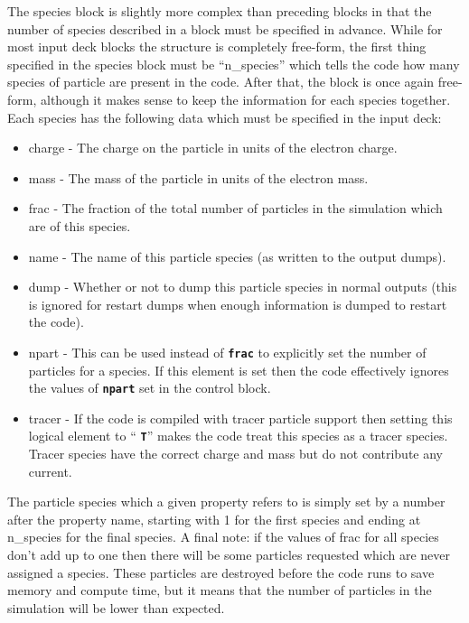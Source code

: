 \documentclass[12pt,a4paper]{article}
\newcommand{\inlinecode}[1]{{\color{warwickred} \bf\texttt{#1}}}
\begin{document}
The species block is slightly more complex than preceding blocks in that the
number of species described in a block must be specified in advance. While
for most input deck blocks the structure is completely free-form, the first
thing specified in the species block must be ``n\_species'' which tells the
code how many species of particle are present in the code. After that, the
block is once again free-form, although it makes sense to keep the information
for each species together. Each species has the following data which must be
specified in the input deck:\\
\begin{itemize}
\item charge - The charge on the particle in units of the electron charge.
\item mass - The mass of the particle in units of the electron mass.
\item frac - The fraction of the total number of particles in the simulation
  which are of this species.
\item name - The name of this particle species (as written to the output
  dumps).
\item dump - Whether or not to dump this particle species in normal outputs
  (this is ignored for restart dumps when enough information is dumped to
  restart the code).
\item npart - This can be used instead of \inlinecode{frac} to explicitly set
  the number of particles for a species. If this element is set then the code
  effectively ignores the values of \inlinecode{npart} set in the control
  block.
\item tracer - If the code is compiled with tracer particle support then
  setting this logical element to ``\inlinecode{T}'' makes the code treat this
  species as a tracer species. Tracer species have the correct charge and mass
  but do not contribute any current.
\end{itemize}

The particle species which a given property refers to is simply set by a
number after the property name, starting with 1 for the first species and
ending at n\_species for the final species. A final note: if the values of
frac for all species don't add up to one then there will be some particles
requested which are never assigned a species. These particles are destroyed
before the code runs to save memory and compute time, but it means that the
number of particles in the simulation will be lower than expected.\\
\end{document}
